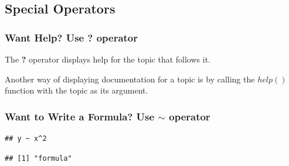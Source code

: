 \documentclass[12pt]{book}\usepackage{knitr}
\begin{document}
\subsection{Special Operators}
\subsubsection{Want Help? Use \textbf{?} operator}
\noindent The \textbf{?} operator displays help for the topic that follows it.
\begin{knitrout}
\color{fgcolor}\begin{kframe}
\begin{alltt}
\end{alltt}
\end{kframe}
\end{knitrout}

\noindent Another way of displaying documentation for a topic is by calling the $help()$ function with the topic as its argument. 
\begin{knitrout}
\color{fgcolor}\begin{kframe}
\begin{alltt}
\hlstd{(}\hlstd{)}
\end{alltt}
\end{kframe}
\end{knitrout}

\subsubsection{Want to Write a Formula? Use $\sim$ operator}
\begin{HIGHLIGHT}
\par{}
\end{HIGHLIGHT}
\begin{knitrout}
\color{fgcolor}\begin{kframe}
\begin{alltt}
 \hlopt{~} \hlopt{^}
\end{alltt}
\begin{verbatim}
## y ~ x^2
\end{verbatim}
\begin{alltt}
 \hlopt{~} \hlopt{^}\hlstd{)}
\end{alltt}
\begin{verbatim}
## [1] "formula"
\end{verbatim}
\end{kframe}
\end{knitrout}
\end{document}

